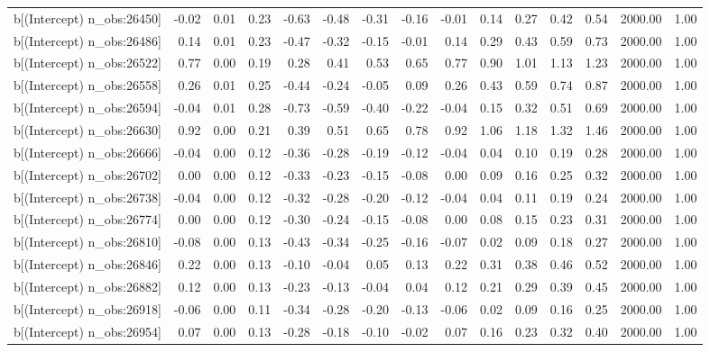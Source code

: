 \begin{table}[ht]
\begin{tabular}{rrrrrrrrrrrrrrr}
  b[(Intercept) n\_obs:26450] & -0.02 & 0.01 & 0.23 & -0.63 & -0.48 & -0.31 & -0.16 & -0.01 & 0.14 & 0.27 & 0.42 & 0.54 & 2000.00 & 1.00 \\ 
  b[(Intercept) n\_obs:26486] & 0.14 & 0.01 & 0.23 & -0.47 & -0.32 & -0.15 & -0.01 & 0.14 & 0.29 & 0.43 & 0.59 & 0.73 & 2000.00 & 1.00 \\ 
  b[(Intercept) n\_obs:26522] & 0.77 & 0.00 & 0.19 & 0.28 & 0.41 & 0.53 & 0.65 & 0.77 & 0.90 & 1.01 & 1.13 & 1.23 & 2000.00 & 1.00 \\ 
  b[(Intercept) n\_obs:26558] & 0.26 & 0.01 & 0.25 & -0.44 & -0.24 & -0.05 & 0.09 & 0.26 & 0.43 & 0.59 & 0.74 & 0.87 & 2000.00 & 1.00 \\ 
  b[(Intercept) n\_obs:26594] & -0.04 & 0.01 & 0.28 & -0.73 & -0.59 & -0.40 & -0.22 & -0.04 & 0.15 & 0.32 & 0.51 & 0.69 & 2000.00 & 1.00 \\ 
  b[(Intercept) n\_obs:26630] & 0.92 & 0.00 & 0.21 & 0.39 & 0.51 & 0.65 & 0.78 & 0.92 & 1.06 & 1.18 & 1.32 & 1.46 & 2000.00 & 1.00 \\ 
  b[(Intercept) n\_obs:26666] & -0.04 & 0.00 & 0.12 & -0.36 & -0.28 & -0.19 & -0.12 & -0.04 & 0.04 & 0.10 & 0.19 & 0.28 & 2000.00 & 1.00 \\ 
  b[(Intercept) n\_obs:26702] & 0.00 & 0.00 & 0.12 & -0.33 & -0.23 & -0.15 & -0.08 & 0.00 & 0.09 & 0.16 & 0.25 & 0.32 & 2000.00 & 1.00 \\ 
  b[(Intercept) n\_obs:26738] & -0.04 & 0.00 & 0.12 & -0.32 & -0.28 & -0.20 & -0.12 & -0.04 & 0.04 & 0.11 & 0.19 & 0.24 & 2000.00 & 1.00 \\ 
  b[(Intercept) n\_obs:26774] & 0.00 & 0.00 & 0.12 & -0.30 & -0.24 & -0.15 & -0.08 & 0.00 & 0.08 & 0.15 & 0.23 & 0.31 & 2000.00 & 1.00 \\ 
  b[(Intercept) n\_obs:26810] & -0.08 & 0.00 & 0.13 & -0.43 & -0.34 & -0.25 & -0.16 & -0.07 & 0.02 & 0.09 & 0.18 & 0.27 & 2000.00 & 1.00 \\ 
  b[(Intercept) n\_obs:26846] & 0.22 & 0.00 & 0.13 & -0.10 & -0.04 & 0.05 & 0.13 & 0.22 & 0.31 & 0.38 & 0.46 & 0.52 & 2000.00 & 1.00 \\ 
  b[(Intercept) n\_obs:26882] & 0.12 & 0.00 & 0.13 & -0.23 & -0.13 & -0.04 & 0.04 & 0.12 & 0.21 & 0.29 & 0.39 & 0.45 & 2000.00 & 1.00 \\ 
  b[(Intercept) n\_obs:26918] & -0.06 & 0.00 & 0.11 & -0.34 & -0.28 & -0.20 & -0.13 & -0.06 & 0.02 & 0.09 & 0.16 & 0.25 & 2000.00 & 1.00 \\ 
  b[(Intercept) n\_obs:26954] & 0.07 & 0.00 & 0.13 & -0.28 & -0.18 & -0.10 & -0.02 & 0.07 & 0.16 & 0.23 & 0.32 & 0.40 & 2000.00 & 1.00 \\ 

\end{tabular}
\end{table}
